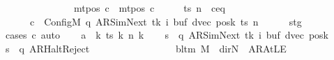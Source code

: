 \begin{isabellebody}
\ \ \ \ \ \ \ \ \ \ \ \ \ \ {\isasymand}\ mt{\isacharunderscore}{\kern0pt}pos\ c{\isacharprime}{\kern0pt}{\isacharprime}{\kern0pt}\ {\isacharequal}{\kern0pt}\ mt{\isacharunderscore}{\kern0pt}pos\ c{\isacharprime}{\kern0pt}{\isachardoublequoteclose}\isanewline
%
\isadelimproof
%
\endisadelimproof
%
\isatagproof
{}\isamarkupfalse%
\ {\isacharminus}{\kern0pt}\isanewline
\ \ \isamarkupfalse%
\ ts\ n\ \ c{\isacharprime}{\kern0pt}{\isacharunderscore}{\kern0pt}eq{\isacharcolon}{\kern0pt}\isanewline
\ \ \ \ \ \ {\isachardoublequoteopen}c{\isacharprime}{\kern0pt}\ {\isacharequal}{\kern0pt}\ Config\isactrlsub M\ {\isacharparenleft}{\kern0pt}q{\isacharcomma}{\kern0pt}\ AR{\isacharunderscore}{\kern0pt}SimNext{\isacharcomma}{\kern0pt}\ tk{\isacharcomma}{\kern0pt}\ i{\isacharcomma}{\kern0pt}\ buf{\isacharcomma}{\kern0pt}\ dvec{\isacharcomma}{\kern0pt}\ posk{\isacharparenright}{\kern0pt}\ ts\ n{\isachardoublequoteclose}\isanewline
\ \ \ \ \isamarkupfalse%
\ stg\ \isamarkupfalse%
\ {\isacharparenleft}{\kern0pt}cases\ c{\isacharprime}{\kern0pt}{\isacharparenright}{\kern0pt}\ auto\isanewline
\ \ \isamarkupfalse%
\ {\isacharquery}{\kern0pt}a\ {\isacharequal}{\kern0pt}\ {\isachardoublequoteopen}{\isasymlambda}k{\isachardot}{\kern0pt}\ ts\ k\ {\isacharparenleft}{\kern0pt}n\ k{\isacharparenright}{\kern0pt}{\isachardoublequoteclose}\isanewline
\ \ \isamarkupfalse%
\ {\isacharquery}{\kern0pt}s\ {\isacharequal}{\kern0pt}\ {\isachardoublequoteopen}{\isacharparenleft}{\kern0pt}q{\isacharcomma}{\kern0pt}\ AR{\isacharunderscore}{\kern0pt}SimNext{\isacharcomma}{\kern0pt}\ tk{\isacharcomma}{\kern0pt}\ i{\isacharcomma}{\kern0pt}\ buf{\isacharcomma}{\kern0pt}\ dvec{\isacharcomma}{\kern0pt}\ posk{\isacharparenright}{\kern0pt}{\isachardoublequoteclose}\isanewline
\ \ \isamarkupfalse%
\ {\isacharquery}{\kern0pt}s{\isacharprime}{\kern0pt}\ {\isacharequal}{\kern0pt}\ {\isachardoublequoteopen}{\isacharparenleft}{\kern0pt}q{\isacharcomma}{\kern0pt}\ AR{\isacharunderscore}{\kern0pt}HaltReject{\isacharcomma}{\kern0pt}\ {}{\isacharcomma}{\kern0pt}\ {}{\isacharcomma}{\kern0pt}\isanewline
\ \ \ \ \ \ \ \ \ \ \ \ \ \ {\isacharparenleft}{\kern0pt}{\isasymlambda}{\isacharunderscore}{\kern0pt}{\isachardot}{\kern0pt}\ bl{\isacharunderscore}{\kern0pt}tm\ M{\isacharparenright}{\kern0pt}{\isacharcomma}{\kern0pt}\ {\isacharparenleft}{\kern0pt}{\isasymlambda}{\isacharunderscore}{\kern0pt}{\isachardot}{\kern0pt}\ dir{\isachardot}{\kern0pt}N{\isacharparenright}{\kern0pt}{\isacharcomma}{\kern0pt}\ {\isacharparenleft}{\kern0pt}{\isasymlambda}{\isacharunderscore}{\kern0pt}{\isachardot}{\kern0pt}\ AR{\isacharunderscore}{\kern0pt}AtLE{\isacharparenright}{\kern0pt}{\isacharparenright}{\kern0pt}{\isachardoublequoteclose}\isanewline

\end{isabellebody}
